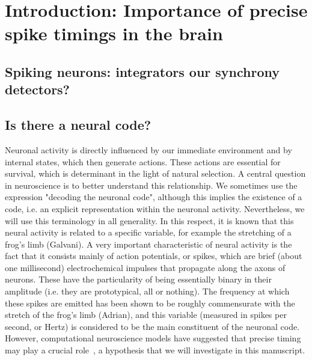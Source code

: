 \documentclass[brainsci, %
               review,submit,pdftex,moreauthors]{Definitions/mdpi}
\begin{document}
%
\section{Introduction: Importance of precise spike timings in the brain}\label{sec:time}
\subsection{Spiking neurons: integrators our synchrony detectors?}
%
\subsection{Is there a neural code?}
%
Neuronal activity is directly influenced by our immediate environment and by internal states, which then generate actions. These actions are essential for survival, which is determinant in the light of natural selection. A central question in neuroscience is to better understand this relationship. We sometimes use the expression "decoding the neuronal code", although this implies the existence of a code, i.e. an explicit representation within the neuronal activity. Nevertheless, we will use this terminology in all generality. In this respect, it is known that this neural activity is related to a specific variable, for example the stretching of a frog's limb (Galvani). A very important characteristic of neural activity is the fact that it consists mainly of action potentials, or spikes, which are brief (about one millisecond) electrochemical impulses that propagate along the axons of neurons. These have the particularity of being essentially binary in their amplitude (i.e. they are prototypical, all or nothing).  The frequency at which these spikes are emitted has been shown to be roughly commensurate with the stretch of the frog's limb (Adrian), and this variable (measured in spikes per second, or Hertz) is considered to be the main constituent of the neuronal code. However, computational neuroscience models have suggested that precise timing may play a crucial role~\citep{paugam-moisy_computing_2012}, a hypothesis that we will investigate in this manuscript.
\end{document}
